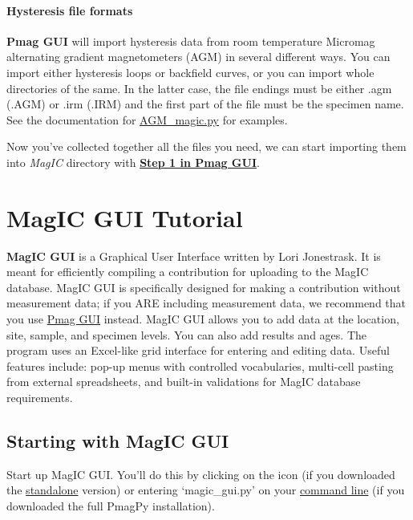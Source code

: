 \documentclass[11pt]{book}
\begin{document}
{

\subsubsection{Hysteresis file formats}
{\bf Pmag GUI} will import hysteresis data from room temperature  Micromag alternating gradient magnetometers (AGM)  in several different ways.  You can import either hysteresis loops or backfield curves, or you can import whole directories of the same.  In the latter case, the file endings must be either .agm (.AGM) or .irm (.IRM) and the first part of the file must be the specimen name.
 See the documentation for  \href{#AGM\_magic.py}{AGM\_magic.py} for examples.


Now you've collected together all the files you need, we can start importing them into {\it MagIC} directory with   \href{#convert2magic}{\bf Step 1 in Pmag GUI}.




\chapter{MagIC GUI Tutorial}
\label{chap:MagIC GUI}

{\bf MagIC GUI} is a Graphical User Interface written by Lori Jonestrask.  It is meant for efficiently compiling a contribution for uploading to the MagIC database.  MagIC GUI is specifically designed for making a contribution without measurement data; if you ARE including measurement data, we recommend that you use \href{#pmag_gui.py}{Pmag GUI} instead.
MagIC GUI allows you to add data at the location, site, sample, and specimen levels.  You can also add results and ages.  The program uses an Excel-like grid interface for entering and editing data.  Useful features include: pop-up menus with controlled vocabularies, multi-cell pasting from external spreadsheets, and built-in validations for MagIC database requirements.


\section{Starting with MagIC GUI}
Start up MagIC GUI.  You'll do this by clicking on the icon (if you downloaded the \href{#standalone}{standalone} version) or entering `magic\_gui.py' on your \href{#command_line}{command line} (if you downloaded the full PmagPy installation).

}
\end{document}
